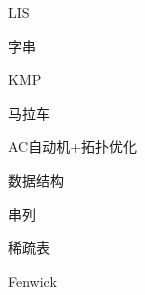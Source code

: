 \documentclass{article}
\begin{document}
\begin{enumerate}
\begin{itemize}
	{\bf \item  LIS}
		
	
	
	\end{itemize}

{\bf \LARGE \item  字串}

	\begin{itemize}
	
	{\bf \item KMP}
		
	
	{\bf \item 马拉车}
		
	
	{\bf \item AC自动机+拓扑优化}
	
		
	
	\end{itemize}
	

{\bf \LARGE \item  数据结构}

	\begin{itemize}
	
	{\bf \item 串列}
		
	
	{\bf \item 稀疏表}
				
	
	{\bf \item Fenwick}
	
	
	\end{itemize}



\end{enumerate}
\end{document}
